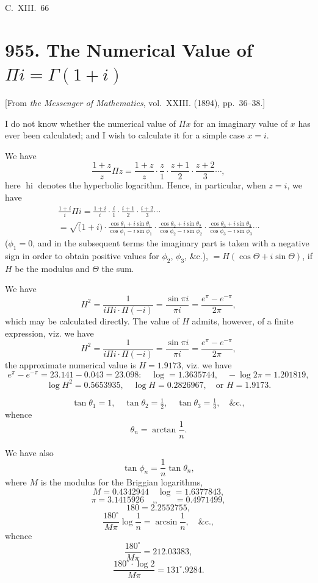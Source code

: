 \documentclass[11pt,a4paper]{book}
\begin{document}
\hfill C.~XIII.~66

\newpage
\section{955. The Numerical Value of $\Pi i = \Gamma(1+i)$}
\label{sec:955}

[From \textit{the Messenger of Mathematics}, vol.~XXIII. (1894), pp.~36--38.]
\bigskip

I do not know whether the numerical value of $\Pi x$ for an imaginary value of $x$ has ever been calculated; and I wish to calculate it for a simple case $x=i$.

We have
\[
\frac{1+z}{z}\Pi z = \frac{1+z}{z}\cdot\frac{z}{1}\cdot\frac{z+1}{2}\cdot\frac{z+2}{3}\cdots,
\]
here $\operatorname{hi}$ denotes the hyperbolic logarithm. Hence, in particular, when $z=i$, we have
\begin{multline*}
\frac{1+i}{i}\Pi i =
\frac{1+i}{i}\cdot\frac{i}{1}\cdot\frac{i+1}{2}\cdot\frac{i+2}{3}\cdots \\
= \surd(1+i) \cdot \frac{\cos\theta_1+i\sin\theta_1}{\cos\phi_1-i\sin\phi_1}
\cdot \frac{\cos\theta_2+i\sin\theta_2}{\cos\phi_2-i\sin\phi_2}
\cdot \frac{\cos\theta_3+i\sin\theta_3}{\cos\phi_3-i\sin\phi_3} \cdots
\end{multline*}
($\phi_1=0$, and in the subsequent terms the imaginary part is taken with a negative sign in order to obtain positive values for $\phi_2$, $\phi_3$, \&c.), $= H(\cos\Theta + i\sin\Theta)$, if $H$ be the modulus and $\Theta$ the sum.

We have
\[
H^2 = \frac{1}{i\Pi i \cdot \Pi(-i)} = \frac{\sin\pi i}{\pi i} = \frac{e^{\pi}-e^{-\pi}}{2\pi},
\]
which may be calculated directly. The value of $H$ admits, however, of a finite expression, viz. we have
\[
H^2 = \frac{1}{i\Pi i \cdot \Pi(-i)} = \frac{\sin\pi i}{\pi i} = \frac{e^{\pi}-e^{-\pi}}{2\pi},
\]
the approximate numerical value is $H=1.9173$, viz. we have
\[
e^{\pi}-e^{-\pi} = 23.141 - 0.043 = 23.098 : \quad \log = 1.3635744, \quad -\log 2\pi = 1.201819,
\]
\[
\log H^2 = 0.5653935, \quad \log H = 0.2826967, \quad \text{or } H = 1.9173.
\]

\[
\tan\theta_1 = 1, \quad \tan\theta_2 = \tfrac{1}{2}, \quad \tan\theta_3 = \tfrac{1}{3}, \quad \&\text{c.},
\]
whence
\[
\theta_n = \arctan\frac{1}{n}.
\]

We have also
\[
\tan\phi_n = \frac{1}{n}\tan\theta_n,
\]
where $M$ is the modulus for the Briggian logarithms,
\[
M = 0.4342944 \quad \log = 1.6377843,
\]
\[
\pi = 3.1415926 \quad \text{,,}\quad\quad = 0.4971499,
\]
\[
180 = 2.2552755,
\]
\[
\frac{180^{\circ}}{M\pi}\log\frac{1}{n} = \arcsin\frac{1}{n}, \quad \&\text{c.},
\]
whence
\[
\frac{180^{\circ}}{M\pi} = 212.03383,
\]
\[
\frac{180^{\circ}\cdot\log 2}{M\pi} = 131^{\circ}.9284.
\]
\end{document}
